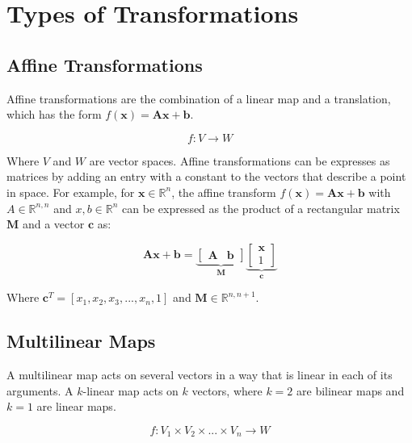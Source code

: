 \section{Types of Transformations}

\subsection{Affine Transformations}

Affine transformations are the combination of a linear map and a translation, which has the form $f(\mathbf{x}) = \mathbf{A}\mathbf{x} + \mathbf{b}$. 

\begin{equation}
f: V \rightarrow W
\end{equation}

Where $V$ and $W$ are vector spaces. Affine transformations can be expresses as matrices by adding an entry with a constant to the vectors that describe a point in space. For example, for $\mathbf{x} \in \mathbb{R}^n$,  the affine transform $f(\mathbf{x}) = \mathbf{A}\mathbf{x} + \mathbf{b}$ with $A\in\mathbb{R}^{n,n}$ and $x,b \in \mathbb{R}^{n}$ can be expressed as the product of a rectangular matrix $\mathbf{M}$ and a vector $\mathbf{c}$ as:

\begin{equation}
\mathbf{A}\mathbf{x} + \mathbf{b} = \underbrace{\left[\begin{array}{c|c} \mathbf{A} & \mathbf{b} \end{array}\right]}_{\mathbf{M}} \underbrace{\left[\begin{array}{c} \mathbf{x} \\ 1\end{array} \right]}_{\mathbf{c}}
\end{equation}

Where $\mathbf{c}^T = \left[x_1,x_2,x_3,...,x_n,1\right]$ and $\mathbf{M} \in \mathbb{R}^{n,n+1}$.

\subsection{Multilinear Maps}

A multilinear map acts on several vectors in a way that is linear in each of its arguments. A $k$-linear map acts on $k$ vectors, where $k=2$ are bilinear maps and $k=1$ are linear maps.

\begin{equation}	
f: V_1 \times V_2 \times ... \times V_n \rightarrow W
\end{equation}


